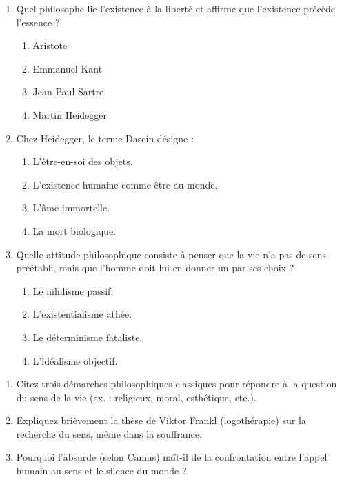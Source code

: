 \documentclass[11pt]{article}
\begin{document}
\begin{exercice}
\begin{enumerate}
    \item Quel philosophe lie l'existence à la \og liberté \fg et affirme que \og l'existence précède l'essence \fg ?
    \begin{enumerate}
        \item Aristote
        \item Emmanuel Kant
        \item Jean-Paul Sartre
        \item Martin Heidegger
    \end{enumerate}
    \item Chez Heidegger, le terme \og Dasein \fg désigne :
    \begin{enumerate}
        \item L'être-en-soi des objets.
        \item L'existence humaine comme être-au-monde.
        \item L'âme immortelle.
        \item La mort biologique.
    \end{enumerate}
    \item Quelle attitude philosophique consiste à penser que la vie n'a pas de sens préétabli, mais que l'homme doit lui en donner un par ses choix ?
    \begin{enumerate}
        \item Le nihilisme passif.
        \item L'existentialisme athée.
        \item Le déterminisme fataliste.
        \item L'idéalisme objectif.
    \end{enumerate}
\end{enumerate}
\end{exercice}

\begin{exercice}
\begin{enumerate}
    \item Citez trois démarches philosophiques classiques pour répondre à la question du sens de la vie (ex. : religieux, moral, esthétique, etc.).
    \item Expliquez brièvement la thèse de Viktor Frankl (logothérapie) sur la recherche du sens, même dans la souffrance.
    \item Pourquoi l'absurde (selon Camus) naît-il de la confrontation entre l'appel humain au sens et le \og silence du monde \fg ?
\end{enumerate}
\end{exercice}
\end{document}
